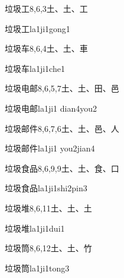 \begin{Entry}{垃圾工}{8,6,3}{⼟、⼟、⼯}
  \begin{Phonetics}{垃圾工}{la1ji1gong1}
  \end{Phonetics}
\end{Entry}

\begin{Entry}{垃圾车}{8,6,4}{⼟、⼟、⾞}
  \begin{Phonetics}{垃圾车}{la1ji1che1}
  \end{Phonetics}
\end{Entry}

\begin{Entry}{垃圾电邮}{8,6,5,7}{⼟、⼟、⽥、⾢}
  \begin{Phonetics}{垃圾电邮}{la1ji1 dian4you2}
  \end{Phonetics}
\end{Entry}

\begin{Entry}{垃圾邮件}{8,6,7,6}{⼟、⼟、⾢、⼈}
  \begin{Phonetics}{垃圾邮件}{la1ji1 you2jian4}
  \end{Phonetics}
\end{Entry}

\begin{Entry}{垃圾食品}{8,6,9,9}{⼟、⼟、⾷、⼝}
  \begin{Phonetics}{垃圾食品}{la1ji1shi2pin3}
  \end{Phonetics}
\end{Entry}

\begin{Entry}{垃圾堆}{8,6,11}{⼟、⼟、⼟}
  \begin{Phonetics}{垃圾堆}{la1ji1dui1}
  \end{Phonetics}
\end{Entry}

\begin{Entry}{垃圾筒}{8,6,12}{⼟、⼟、⽵}
  \begin{Phonetics}{垃圾筒}{la1ji1tong3}
  \end{Phonetics}
\end{Entry}

